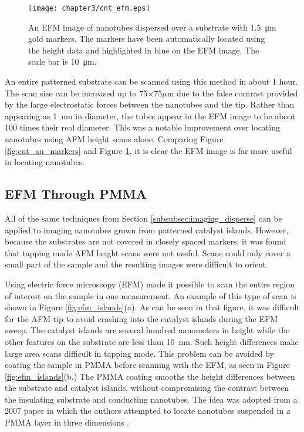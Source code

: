 \begin{figure}
	\centering
	\texttt{[image: chapter3/cnt\_efm.eps]}
	\caption{An EFM image of nanotubes dispersed over a substrate with \SI{1.5}{\micro\meter} gold markers. The markers have been automatically located using the height data and highlighted in blue on the EFM image. The scale bar is \SI{10}{\micro\meter}.}
	\label{fig:cnt_efm}
\end{figure}

An entire patterned substrate can be scanned using this method in about 1 hour. The scan size can be increased up to 75$\times$75$\mu$m due to the false contrast provided by the large electrostatic forces between the nanotubes and the tip. Rather than appearing as \SI{1}{\nano\meter} in diameter, the tubes appear in the EFM image to be about 100 times their real diameter. This was a notable improvement over locating nanotubes using AFM height scans alone. Comparing Figure \ref{fig:cnt_au_markers} and Figure \ref{fig:cnt_efm}, it is clear the EFM image is far more useful in locating nanotubes.

\subsection{EFM Through PMMA}

All of the same techniques from Section \ref{subsubsec:imaging_disperse} can be applied to imaging nanotubes grown from patterned catalyst islands. However, because the substrates are not covered in closely spaced markers, it was found that tapping mode AFM height scans were not useful. Scans could only cover a small part of the sample and the resulting images were difficult to orient.

Using electric force microscopy (EFM) made it possible to scan the entire region of interest on the sample in one measurement. An example of this type of scan is shown in Figure \ref{fig:efm_islands}(a). As can be seen in that figure, it was difficult for the AFM tip to avoid crashing into the catalyst islands during the EFM sweep. The catalyst islands are several hundred nanometers in height while the other features on the substrate are less than \SI{10}{\nano\meter}. Such height differences make large area scans difficult in tapping mode. This problem can be avoided by coating the sample in PMMA before scanning with the EFM, as seen in Figure \ref{fig:efm_islands}(b.) The PMMA coating smooths the height differences between the substrate and catalyst islands, without compromising the contrast between the insulating substrate and conducting nanotubes. The idea was adopted from a 2007 paper in which the authors attempted to locate nanotubes suspended in a PMMA layer in three dimensions \cite{Jespersen2007}.

